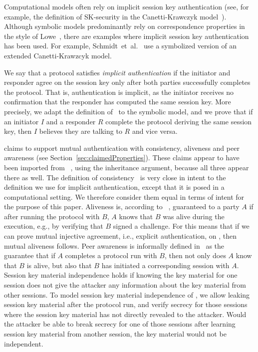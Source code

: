 Computational models often rely on implicit session key authentication
(see, for example, the definition of SK-security in the Canetti-Krawczyk
model~\cite{DBLP:conf/crypto/CanettiK02}).
%
Although symbolic models predominantly rely on correspondence properties
in the style of Lowe~\cite{DBLP:conf/csfw/Lowe97a}, there are examples where
implicit session key authentication has been used.
%
For example, Schmidt~et~al.~\cite{DBLP:conf/csfw/SchmidtMCB12} use a
symbolized version of an extended Canetti-Krawzcyk model.

%
We say that a protocol satisfies \emph{implicit authentication} if the
initiator and responder agree on the session key only after both parties
successfully completes the protocol.
%
That is, authentication is implicit, as the
initiator receives no confirmation that the responder has computed the same session key.
%
More precisely, we adapt the definition of~\cite{DBLP:journals/iacr/GuilhemFW19}
to the symbolic model, and we prove that if an initiator $I$ and a responder $R$
complete the protocol deriving the same session key, then $I$ believes they are
talking to $R$ and vice versa.
%

\mEdhoc{} claims to support mutual authentication with consistency, aliveness
and peer awareness (see Section~\ref{sec:claimedProperties}).
%
These claims appear to have been imported from \mSigma{}~\cite{sigma}, using the
inheritance argument, because all three appear there as well.
%
The definition of consistency~\cite{sigma} is very close in intent to the
definition we use for implicit authentication, except that it is posed in a
computational setting.
%
We therefore consider them equal in terms of intent for the purpose of this
paper.
%
Aliveness is, according to \mSigma{}~\cite{sigma}, guaranteed to a party $A$ if
after running the protocol with $B$, $A$ knows that $B$ was alive during
the execution, e.g., by verifying that $B$ signed a challenge.
%
For \mEdhoc{} this means that if we can prove mutual injective agreement, i.e.,
explicit authentication, on \mGxy{}, then mutual aliveness follows.
%
Peer awareness is informally defined in~\cite{sigma} as the guarantee
that if $A$ completes a protocol run with $B$, then not only does $A$
know that $B$ is alive, but also that $B$ has initiated a corresponding session
with $A$.
\\

Session key material independence holds if knowing the key material for one
session does not give the attacker any information about the key material from
other sessions.  To model session
key material independence of \mEdhoc, we allow leaking session key material
after the protocol run, and verify secrecy for those sessions where the
session key material has not directly revealed to the attacker.
Would the attacker be able to break secrecy for one of those sessions after
learning session key material from another session, the key material would not 
be independent.\\

